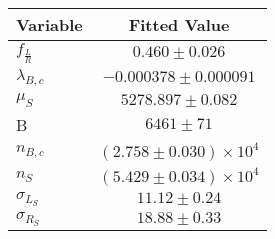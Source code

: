 \begin{tabular}[t]{lc}
\hline
Variable &Fitted Value\\
\hline\hline
$f_{\frac{L}{R}}$&$0.460\pm0.026$\\
\hline
$\lambda_{B,c}$&$-0.000378\pm0.000091$\\
\hline
$\mu_S$&$5278.897\pm0.082$\\
\hline
B&$6461\pm71$\\
\hline
$n_{B,c}$&$(2.758\pm0.030)\times 10^4$\\
\hline
$n_S$&$(5.429\pm0.034)\times 10^4$\\
\hline
$\sigma_{L_S}$&$11.12\pm0.24$\\
\hline
$\sigma_{R_S}$&$18.88\pm0.33$\\
\hline
\end{tabular}